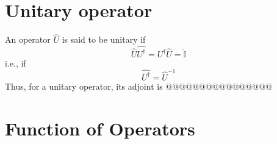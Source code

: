 \section{Unitary operator}
An operator $\hat{U}$ is said to be unitary if
\begin{equation}
\hat{U} \hat{U^\dagger} = \hat{U^\dagger} \hat{U} = \hat{\mathbb{I}}
\end{equation}
i.e., if
\begin{equation}
\hat{U^\dagger} = \hat{U}^{-1}
\end{equation}
Thus, for a unitary operator, its adjoint is $@@@@@@@@@@@@@@@@$

\section{Function of Operators}

